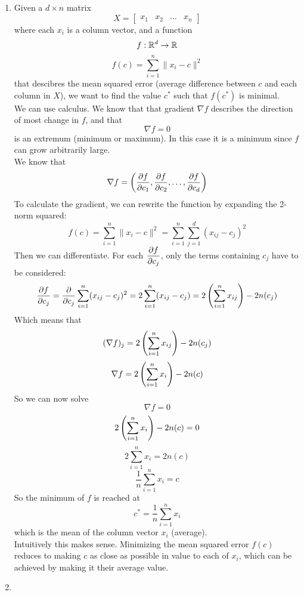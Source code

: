 \documentclass[12pt]{article}
\begin{document}
    \begin{enumerate}[label=\alph*)]
        \item 
        Given a $d \times n$ matrix
        \[ X = \begin{bmatrix}
            x_1 & x_2 & \dots & x_n
        \end{bmatrix} \]
        where each $x_i$ is a column vector,
        and a function
        \[ f:\mathbb{R}^d \to \mathbb{R} \]
        \[ f(c) = \sum_{i=1}^{n}\|x_i - c\|^2 \]
        that descibres the mean squared
        error (average difference between $c$
        and each column in $X$),
        we want to find the value $c^*$
        such that $f(c^*)$ is minimal. \\
        We can use calculus.
        We know that that gradient $\nabla f$
        describes the direction of most change
        in $f$,
        and that
        \[\nabla f = 0\]
        is an extremum (minimum or maximum).
        In this case it is a minimum since
        $f$ can grow arbitrarily large. \\
        We know that
        \[ \nabla f = \left( \dfrac{\partial f}{\partial c_1},
        \dfrac{\partial f}{\partial c_2}, \dots, \dfrac{\partial f}{\partial c_d} \right) \]
        To calculate the gradient,
        we can rewrite the function by expanding
        the 2-norm squared:
        \[ f(c) = \sum_{i=1}^{n}\|x_i - c\|^2
        = \sum_{i=1}^{n}\sum_{j=1}^{d}(x_{ij} - c_j)^2 \]
        Then we can differentiate.
        For each $\dfrac{\partial f}{\partial c_j}$,
        only the terms containing $c_j$
        have to be considered:
        \[ \dfrac{\partial f}{\partial c_j} = 
        \dfrac{\partial }{\partial c_j}\sum_{i=1}^{n}(x_{ij} - c_j)^2
        = 2\sum_{i=1}^{n}(x_{ij} - c_j)
        =  2\left( \sum_{i=1}^{n}x_{ij} \right) - 2n(c_j) \]
        Which means that
        \[ (\nabla f)_j
        = 2\left( \sum_{i=1}^{n}x_{ij} \right) - 2n(c_j) \]
        \[ \nabla f
        = 2\left( \sum_{i=1}^{n}x_{i} \right) - 2n(c) \]
        So we can now solve
        \[ \nabla f = 0 \]
        \[ 2\left( \sum_{i=1}^{n}x_{i} \right) - 2n(c) = 0 \]
        \[ 2\sum_{i=1}^{n}x_{i} = 2n(c) \]
        \[ \dfrac{1}{n}\sum_{i=1}^{n}x_{i} = c \]
        So the minimum of $f$ is reached at
        \[ c^* = \dfrac{1}{n}\sum_{i=1}^{n}x_{i} \]
        which is the mean of the column vector $x_i$
        (average). \\
        Intuitively this makes sense.
        Minimizing the mean squared error $f(c)$
        reduces to making $c$ as close as possible
        in value to each of $x_i$,
        which can be achieved by making it their average
        value. 
        \item

\end{enumerate}
\end{document}
